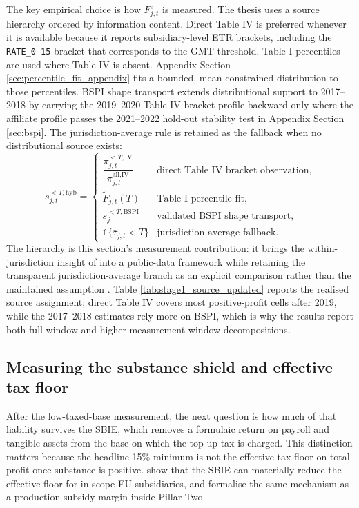 \documentclass[11pt,a4paper]{article}
\newcommand{\code}[1]{\texttt{#1}}
\begin{document}
The key empirical choice is how $F_{j,t}^{e}$ is measured. The thesis uses a source hierarchy ordered by information content. Direct Table IV is preferred whenever it is available because it reports subsidiary-level ETR brackets, including the \code{RATE\_0-15} bracket that corresponds to the GMT threshold. Table I percentiles are used where Table IV is absent. Appendix Section \ref{sec:percentile_fit_appendix} fits a bounded, mean-constrained distribution to those percentiles. BSPI shape transport extends distributional support to 2017--2018 by carrying the 2019--2020 Table IV bracket profile backward only where the affiliate profile passes the 2021--2022 hold-out stability test in Appendix Section \ref{sec:bspi}. The jurisdiction-average rule is retained as the fallback when no distributional source exists:
\begin{equation}\label{eq:hybrid}
s_{j,t}^{<T,\text{hyb}} =
\begin{cases}
\dfrac{\pi_{j,t}^{<T,\text{IV}}}{\pi_{j,t}^{\text{all,IV}}} & \text{direct Table IV bracket observation},\\[8pt]
\tilde{F}_{j,t}(T) & \text{Table I percentile fit},\\[4pt]
\bar{s}_{j}^{<T,\text{BSPI}} & \text{validated BSPI shape transport},\\[4pt]
\mathbb{1}\{\bar{\tau}_{j,t}<T\} & \text{jurisdiction-average fallback}.
\end{cases}
\end{equation}
The hierarchy is this section's measurement contribution: it brings the within-jurisdiction insight of \citet{hugger2026} into a public-data framework while retaining the transparent jurisdiction-average branch as an explicit comparison rather than the maintained assumption \citep{barake2022}. Table \ref{tab:stage1_source_updated} reports the realised source assignment; direct Table IV covers most positive-profit cells after 2019, while the 2017--2018 estimates rely more on BSPI, which is why the results report both full-window and higher-measurement-window decompositions.



\subsection{Measuring the substance shield and effective tax floor}\label{sec:SBIE}\label{sec:floor}\label{sec:payroll_imputation}

After the low-taxed-base measurement, the next question is how much of that liability survives the SBIE, which removes a formulaic return on payroll and tangible assets from the base on which the top-up tax is charged. This distinction matters because the headline 15\% minimum is not the effective tax floor on total profit once substance is positive. \citet{devereux2023} show that the SBIE can materially reduce the effective floor for in-scope EU subsidiaries, and \citet{schjelderup2024} formalise the same mechanism as a production-subsidy margin inside Pillar Two.
\end{document}
